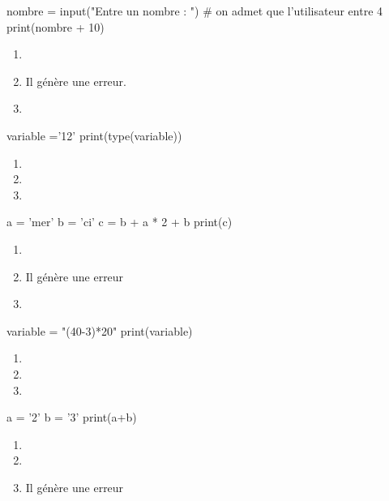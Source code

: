 \documentclass[a4paper,10pt]{article}
\begin{document}
\begin{multicols}{2}
\begin{enumerate}[\case\ \ a.]
\end{enumerate}

\begin{pythoncode}
nombre = input("Entre un nombre : ")
# on admet que l'utilisateur entre 4
print(nombre + 10)
\end{pythoncode}

\begin{enumerate}[\case\ \ a.]
\item    {}
\item   Il génère une erreur.
\item    {}
\end{enumerate}
\newpage
\begin{pythoncode}
variable ='12'
print(type(variable))
\end{pythoncode}
\begin{enumerate}[\case\ \ a.]
\item    {}
\item    {}

\item    {}
\end{enumerate}

\begin{pythoncode}
a = 'mer'
b = 'ci'
c = b + a * 2 + b
print(c)
\end{pythoncode}
\begin{enumerate}[\case\ \ a.]
\item    {}
\item    Il génère une erreur
\item    {}
\end{enumerate}


\begin{pythoncode}
variable = "(40-3)*20"
print(variable)
\end{pythoncode}
\begin{enumerate}[\case\ \ a.]
\item    {}
\item    {}
\item    {}
\end{enumerate}


\begin{pythoncode}
a = '2'
b = '3'
print(a+b)
\end{pythoncode}
\begin{enumerate}[\case\ \ a.]
\item    {}
\item    {}
\item    Il génère une erreur
\end{enumerate}




\end{multicols}
\end{document}
